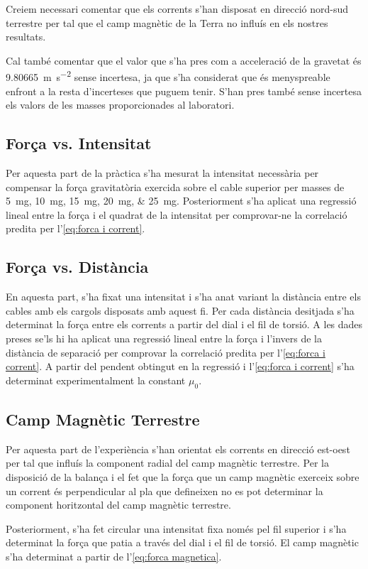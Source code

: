 \begin{multicols*}{2}
	Creiem necessari comentar que els corrents s'han disposat en direcció nord-sud terrestre per tal que el camp magnètic de la Terra no influís en els nostres resultats.

	Cal també comentar que el valor que s'ha pres com a acceleració de la gravetat és \SI{9.80665}{m.s^{-2}} sense incertesa, ja que s'ha considerat que és menyspreable enfront a la resta d'incerteses que puguem tenir. S'han pres també sense incertesa els valors de les masses proporcionades al laboratori.

	\subsection{Força vs. Intensitat}
	Per aquesta part de la pràctica s'ha mesurat la intensitat necessària per compensar la força gravitatòria exercida sobre el cable superior per masses de \SIlist{5; 10; 15; 20; 25}{mg}. Posteriorment s'ha aplicat una regressió lineal entre la força i el quadrat de la intensitat per comprovar-ne la correlació predita per l'\cref{eq:forca i corrent}.

	\subsection{Força vs. Distància}
	En aquesta part, s'ha fixat una intensitat i s'ha anat variant la distància entre els cables amb els cargols disposats amb aquest fi. Per cada distància desitjada s'ha determinat la força entre els corrents a partir del dial i el fil de torsió. A les dades preses se'ls hi ha aplicat una regressió lineal entre la força i l'invers de la distància de separació per comprovar la correlació predita per l'\cref{eq:forca i corrent}. A partir del pendent obtingut en la regressió i l'\cref{eq:forca i corrent} s'ha determinat experimentalment la constant $\mu_0$.

	\subsection{Camp Magnètic Terrestre}
	Per aquesta part de l'experiència %
	s'han orientat els corrents en direcció est-oest per tal que influís la component radial del camp magnètic terrestre. Per la disposició de la balança i el fet que la força que un camp magnètic exerceix sobre un corrent és perpendicular al pla que defineixen no es pot determinar la component horitzontal del camp magnètic terrestre.

	Posteriorment, s'ha fet circular una intensitat fixa només pel fil superior i s'ha determinat la força que patia a través del dial i el fil de torsió. El camp magnètic s'ha determinat a partir de l'\cref{eq:forca magnetica}. 

\end{multicols*}
